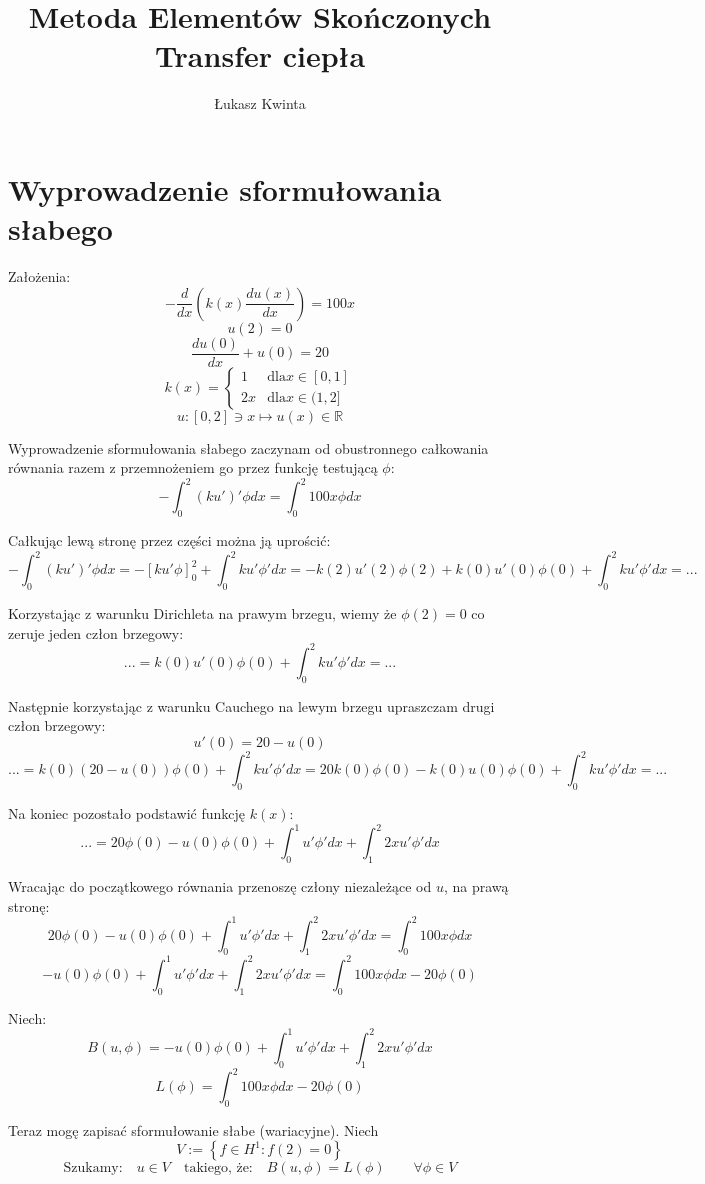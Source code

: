 \documentclass[a4paper]{article}
\title{\fontsize{30pt}{30pt}\selectfont Metoda Elementów Skończonych \\ Transfer ciepła}
\author{\fontsize{20pt}{20pt}\selectfont Łukasz Kwinta}
\date{}
\begin{document}
\maketitle
\pagebreak
\section{Wyprowadzenie sformułowania słabego}
Założenia:
\[-\frac{d}{dx}\left(k(x)\frac{du(x)}{dx}\right) = 100x \]
\[u(2) = 0\]
\[\frac{du(0)}{dx} + u(0) = 20\]
\[k(x) =
 \begin{cases}
    1  & \text{dla} x\in [0,1]\\
    2x & \text{dla} x\in (1,2]
  \end{cases}\]
  \[u: [0,2] \ni x \mapsto u(x) \in \mathbb{R}  \]

  Wyprowadzenie sformułowania słabego zaczynam od obustronnego całkowania równania 
  razem z przemnożeniem go przez funkcję testującą $\phi$:
  \[-\int_{0}^{2}(ku')'\phi dx = \int_{0}^{2}100x\phi dx\]

  Całkując lewą stronę przez części można ją uprościć:
  \[-\int_{0}^{2}(ku')'\phi dx = -\left[ku'\phi\right]_0^2 + \int_{0}^{2}ku'\phi' dx
  = -k(2)u'(2)\phi(2) + k(0)u'(0)\phi(0) + \int_{0}^{2}ku'\phi' dx = ...\]

  Korzystając z warunku Dirichleta na prawym brzegu, wiemy że $\phi(2) = 0$ co zeruje jeden człon brzegowy:
  \[... = k(0)u'(0)\phi(0) + \int_{0}^{2}ku'\phi' dx = ... \]

  Następnie korzystając z warunku Cauchego na lewym brzegu upraszczam drugi człon brzegowy:
  \[u'(0) = 20 - u(0)\]
  \[... = k(0)(20 - u(0))\phi(0) + \int_{0}^{2}ku'\phi' dx = 20k(0)\phi(0) - k(0)u(0)\phi(0) + \int_{0}^{2}ku'\phi' dx = ...\]

  Na koniec pozostało podstawić funkcję $k(x)$:
  \[... = 20\phi(0) - u(0)\phi(0) + \int_{0}^{1}u'\phi' dx + \int_{1}^{2}2xu'\phi' dx\]

  Wracając do początkowego równania przenoszę człony niezależące od $u$, na prawą stronę:
  \[20\phi(0) - u(0)\phi(0) + \int_{0}^{1}u'\phi' dx + \int_{1}^{2}2xu'\phi' dx = \int_{0}^{2}100x\phi dx\]
  \[-u(0)\phi(0) + \int_{0}^{1}u'\phi' dx + \int_{1}^{2}2xu'\phi' dx = \int_{0}^{2}100x\phi dx -20\phi(0)\]

  Niech:
  \[B(u, \phi) = -u(0)\phi(0) + \int_{0}^{1}u'\phi' dx + \int_{1}^{2}2xu'\phi' dx\]
  \[L(\phi) = \int_{0}^{2}100x\phi dx -20\phi(0)\]

  Teraz mogę zapisać sformułowanie słabe (wariacyjne). Niech
  \[ V := \left\{f \in H^1 : f(2) = 0\right\} \]
  \[\text{Szukamy:} \quad u \in V \quad \text{takiego, że:} \quad B(u, \phi) = L(\phi) \qquad \forall \phi \in V \]
  \pagebreak
\end{document}

